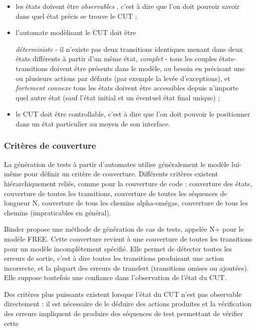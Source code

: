 \begin{itemize}
       
\item les \'etats doivent \^etre 
\emph{observables}
  , c'est \`a
      dire que l'on doit pouvoir savoir dans quel \'etat pr\'ecis se
      trouve le CUT ; 
\item l'automate mod\`elisant le CUT doit \^etre
      
\emph{d\'eterministe}
   - il n'existe pas deux transitions
      identiques menant dans deux \'etats diff\'erents \`a partir d'un m\^eme
      \'etat, 
\emph{complet}
   - tous les couples \'etats-transitions
      doivent \^etre pr\'esents dans le mod\`ele, au besoin en pr\'ecisant une
      ou plusieurs actions par d\'efauts (par exemple la lev\'ee
      d'exceptions), et 
\emph{fortement connexe}
   tous les \'etats
      doivent \^etre accessibles depuis n'importe quel autre \'etat (sauf
      l'\'etat initial et un \'eventuel \'etat final unique) ; 
\item le CUT doit \^etre controllable, c'est \`a dire que l'on doit
      pouvoir le positionner dans un \'etat particulier au moyen de son
      interface.
\end{itemize}
  
\par
  
\subsubsection{Crit\`eres de couverture}
  
    La g\'en\'eration de tests \`a partir d'automates utilise g\'en\'eralement
    le mod\`ele lui-m\^eme pour d\'efinir un crit\`ere de
    couverture. Diff\'erents crit\`eres existent hi\'erarchiquement reli\'es, comme pour la couverture
    de code : couverture des \'etats, couverture de toutes les
    transitions, couverture de toutes les s\'equences de longueur N,
    couverture de tous les chemins alpha-om\'egas, couverture de tous
    les chemins (impraticables en g\'en\'eral).
\par
  Binder propose une m\'ethode de g\'en\'eration de cas de tests,
    appel\'ee N+ pour le mod\`ele FREE. Cette couverture revient \`a une
    couverture de toutes les transitions pour un mod\`ele incompl\`etement
    sp\'ecifi\'e. Elle permet de d\'etecter toutes les erreurs de sortie,
    c'est \`a dire toutes les transitions produisant une action
    incorrecte, et la plupart des  erreurs de transfert (transitions
    omises ou ajout\'ees). Elle suppose toutefois une confiance dans
    l'observation de l'\'etat du CUT.
\par
  Des crit\`eres plus puissants existent lorsque l'\'etat du CUT
    n'est pas observable directement : il est n\'ecessaire de le d\'eduire
    des actions produites et la v\'erification des erreurs impliquent de
    produire des s\'equences de test permettant de v\'erifier cette
    
